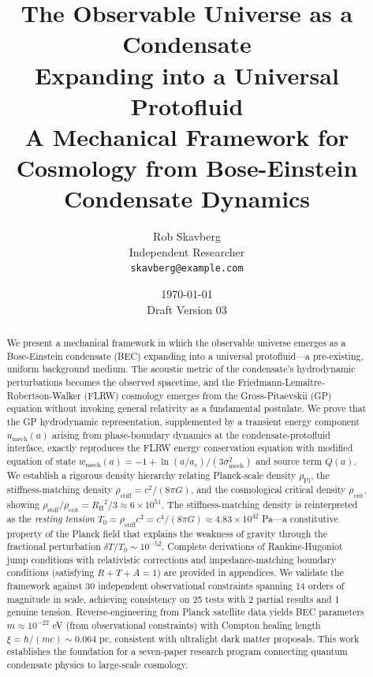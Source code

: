 \documentclass[11pt,a4paper]{article}
\title{\textbf{The Observable Universe as a Condensate\\Expanding into a Universal Protofluid}\\[0.5em]
\large A Mechanical Framework for Cosmology from Bose-Einstein Condensate Dynamics}
\author{Rob Skavberg\\[0.3em]
\small Independent Researcher\\
\small \texttt{skavberg@example.com}}
\date{\today\\[0.5em]
\small Draft Version 03}
\newcommand{\rhocrit}{\ensuremath{\rho_{\mathrm{crit}}}}
\newcommand{\rhostiff}{\ensuremath{\rho_{\mathrm{stiff}}}}
\newcommand{\rhoPl}{\ensuremath{\rho_{\mathrm{Pl}}}}
\newcommand{\Tzero}{\ensuremath{T_0}}
\newcommand{\RH}{\ensuremath{R_{\mathrm{H}}}}
\newcommand{\umech}{\ensuremath{u_{\mathrm{mech}}}}
\newcommand{\wmech}{\ensuremath{w_{\mathrm{mech}}}}
\theoremstyle{definition}
\theoremstyle{remark}
\begin{document}
\maketitle

\begin{abstract}
We present a mechanical framework in which the observable universe emerges as a Bose-Einstein condensate (BEC) expanding into a universal protofluid---a pre-existing, uniform background medium. The acoustic metric of the condensate's hydrodynamic perturbations becomes the observed spacetime, and the Friedmann-Lema\^itre-Robertson-Walker (FLRW) cosmology emerges from the Gross-Pitaevskii (GP) equation without invoking general relativity as a fundamental postulate. We prove that the GP hydrodynamic representation, supplemented by a transient energy component $\umech(a)$ arising from phase-boundary dynamics at the condensate-protofluid interface, exactly reproduces the FLRW energy conservation equation with modified equation of state $\wmech(a) = -1 + \ln(a/a_c)/(3\sigma_{\mathrm{mech}}^2)$ and source term $Q(a)$. We establish a rigorous density hierarchy relating Planck-scale density $\rhoPl$, the stiffness-matching density $\rhostiff = c^2/(8\pi G)$, and the cosmological critical density $\rhocrit$, showing $\rhostiff/\rhocrit = \RH^2/3 \approx 6 \times 10^{51}$. The stiffness-matching density is reinterpreted as the \emph{resting tension} $\Tzero = \rhostiff c^2 = c^4/(8\pi G) \approx 4.83 \times 10^{42}$ Pa---a constitutive property of the Planck field that explains the weakness of gravity through the fractional perturbation $\delta T/\Tzero \sim 10^{-52}$. Complete derivations of Rankine-Hugoniot jump conditions with relativistic corrections and impedance-matching boundary conditions (satisfying $R + T + A = 1$) are provided in appendices. We validate the framework against 30 independent observational constraints spanning 14 orders of magnitude in scale, achieving consistency on 25 tests with 2 partial results and 1 genuine tension. Reverse-engineering from Planck satellite data yields BEC parameters $m \approx 10^{-22}$ eV (from observational constraints) with Compton healing length $\xi = \hbar/(mc) \sim 0.064$ pc, consistent with ultralight dark matter proposals. This work establishes the foundation for a seven-paper research program connecting quantum condensate physics to large-scale cosmology.
\end{abstract}

\tableofcontents
\newpage

\end{document}

